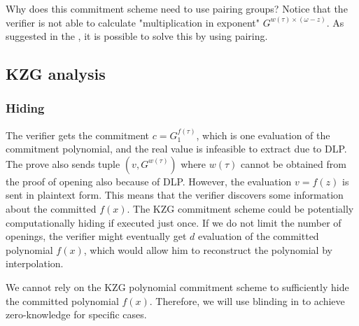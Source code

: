 Why does this commitment scheme need to use pairing groups? Notice that the verifier is not able to calculate "multiplication in exponent" $G^{w(\tau) \times (\omega - z)}$. As suggested in the , it is possible to solve this by using pairing.


\subsection{KZG analysis}
\label{chap:kzg}

\subsubsection{Hiding}
The verifier gets the commitment $c = G_1^{f(\tau)}$, which is one evaluation of the commitment polynomial, and the real value is infeasible to extract due to DLP. The prove also sends tuple $(v, G^{w(\tau)})$ where $w(\tau)$ cannot be obtained from the proof of opening also because of DLP. However, the evaluation $v = f(z)$ is sent in plaintext form. This means that the verifier discovers some information about the committed $f(x)$. The KZG commitment scheme could be potentially computationally hiding if executed just once. If we do not limit the number of openings, the verifier might eventually get $d$ evaluation of the committed polynomial $f(x)$, which would allow him to reconstruct the polynomial by interpolation.

We cannot rely on the KZG polynomial commitment scheme to sufficiently hide the committed polynomial $f(x)$. Therefore, we will use blinding in  to achieve zero-knowledge for specific cases.

